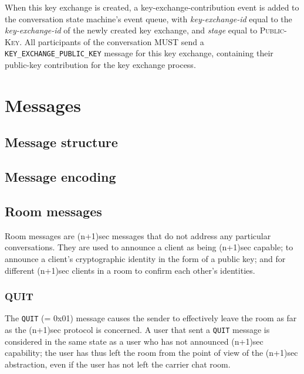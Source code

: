 \documentclass{article}
\def\message#1{\texttt{#1}}
\def\smfield#1{\textsl{#1}}
\def\type#1{\textsf{#1}}
\begin{document}
When this key exchange is created, a \type{key-exchange-contribution} event is added to the conversation state machine's event queue, with \smfield{key-exchange-id} equal to the \smfield{key-exchange-id} of the newly created key exchange, and \smfield{stage} equal to \textsc{Public-Key}.
All participants of the conversation MUST send a \message{KEY\_EXCHANGE\_PUBLIC\_KEY} message for this key exchange, containing their public-key contribution for the key exchange process.



\section{Messages}
\label{sec:messages}


\subsection{Message structure}
\label{sec:messages/message-structure}



\subsection{Message encoding}
\label{sec:messages/message-encoding}



\subsection{Room messages}
\label{sec:messages/room-messages}

Room messages are (n+1)sec messages that do not address any particular conversations.
They are used to announce a client as being (n+1)sec capable; to announce a client's cryptographic identity in the form of a public key; and for different (n+1)sec clients in a room to confirm each other's identities.


\subsubsection{QUIT}
\label{sec:messages/quit}

The \message{QUIT} (= 0x01) message causes the sender to effectively leave the room as far as the (n+1)sec protocol is concerned.
A user that sent a \message{QUIT} message is considered in the same state as a user who has not announced (n+1)sec capability; the user has thus left the room from the point of view of the (n+1)sec abstraction, even if the user has not left the carrier chat room.
\end{document}

